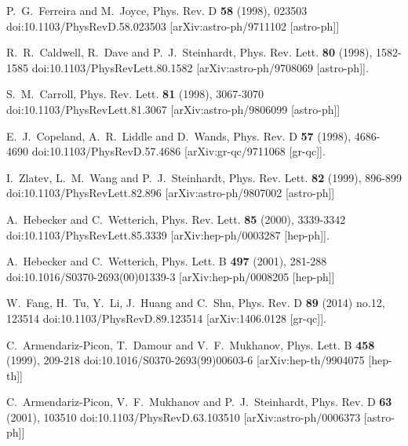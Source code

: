 \documentclass[a4paper,12pt]{article}
\begin{document}
\begin{thebibliography}{99}
P.~G.~Ferreira and M.~Joyce,
Phys. Rev. D \textbf{58} (1998), 023503
doi:10.1103/PhysRevD.58.023503
[arXiv:astro-ph/9711102 [astro-ph]]
		
R.~R.~Caldwell, R.~Dave and P.~J.~Steinhardt,
Phys. Rev. Lett. \textbf{80} (1998), 1582-1585
doi:10.1103/PhysRevLett.80.1582
[arXiv:astro-ph/9708069 [astro-ph]].
		
S.~M.~Carroll,
Phys. Rev. Lett. \textbf{81} (1998), 3067-3070
doi:10.1103/PhysRevLett.81.3067
[arXiv:astro-ph/9806099 [astro-ph]]
		
E.~J.~Copeland, A.~R.~Liddle and D.~Wands,
Phys. Rev. D \textbf{57} (1998), 4686-4690
doi:10.1103/PhysRevD.57.4686
[arXiv:gr-qc/9711068 [gr-qc]].
		
I.~Zlatev, L.~M.~Wang and P.~J.~Steinhardt,
Phys. Rev. Lett. \textbf{82} (1999), 896-899
doi:10.1103/PhysRevLett.82.896
[arXiv:astro-ph/9807002 [astro-ph]]
		
A.~Hebecker and C.~Wetterich,
Phys. Rev. Lett. \textbf{85} (2000), 3339-3342
doi:10.1103/PhysRevLett.85.3339
[arXiv:hep-ph/0003287 [hep-ph]].
		
A.~Hebecker and C.~Wetterich,
Phys. Lett. B \textbf{497} (2001), 281-288
doi:10.1016/S0370-2693(00)01339-3
[arXiv:hep-ph/0008205 [hep-ph]]
				

W.~Fang, H.~Tu, Y.~Li, J.~Huang and C.~Shu,
Phys. Rev. D \textbf{89} (2014) no.12, 123514
doi:10.1103/PhysRevD.89.123514
[arXiv:1406.0128 [gr-qc]].
		
		
C.~Armendariz-Picon, T.~Damour and V.~F.~Mukhanov,
Phys. Lett. B \textbf{458} (1999), 209-218
doi:10.1016/S0370-2693(99)00603-6
[arXiv:hep-th/9904075 [hep-th]]
		
C.~Armendariz-Picon, V.~F.~Mukhanov and P.~J.~Steinhardt,
Phys. Rev. D \textbf{63} (2001), 103510
doi:10.1103/PhysRevD.63.103510
[arXiv:astro-ph/0006373 [astro-ph]]
		

\end{thebibliography}
\end{document}
